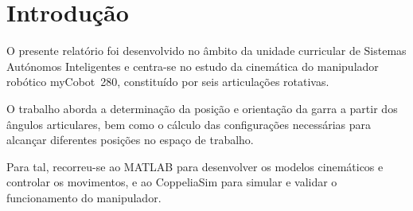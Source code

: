 
\chapter{Introdução}
\label{ch:intro}

O presente relatório foi desenvolvido no âmbito da unidade curricular de Sistemas Autónomos Inteligentes e centra-se no estudo da cinemática do manipulador robótico myCobot~280, constituído por seis articulações rotativas.

O trabalho aborda a determinação da posição e orientação da garra a partir dos ângulos articulares, bem como o cálculo das configurações necessárias para alcançar diferentes posições no espaço de trabalho.

Para tal, recorreu-se ao MATLAB para desenvolver os modelos cinemáticos e controlar os movimentos, e ao CoppeliaSim para simular e validar o funcionamento do manipulador.



